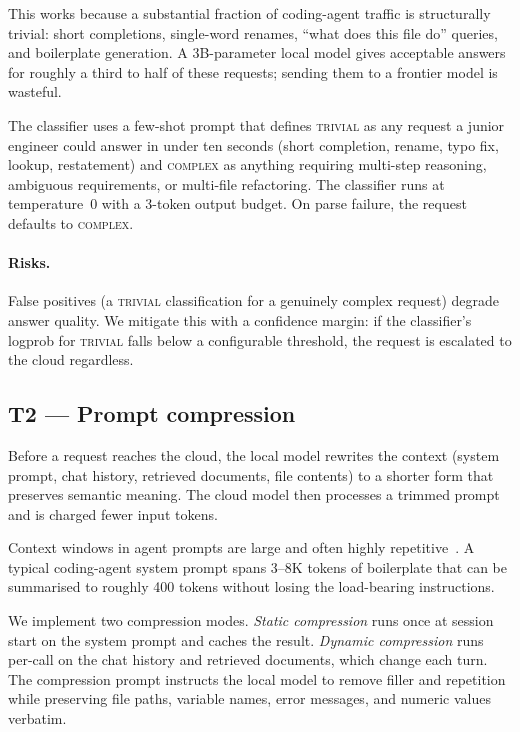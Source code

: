 \documentclass[11pt,a4paper]{article}
\begin{document}
This works because a substantial fraction of coding-agent traffic is
structurally trivial: short completions, single-word renames, ``what
does this file do'' queries, and boilerplate generation. A 3B-parameter
local model gives acceptable answers for roughly a third to half of
these requests; sending them to a frontier model is wasteful.

The classifier uses a few-shot prompt that defines \textsc{trivial} as
any request a junior engineer could answer in under ten seconds (short
completion, rename, typo fix, lookup, restatement) and \textsc{complex}
as anything requiring multi-step reasoning, ambiguous requirements, or
multi-file refactoring. The classifier runs at temperature~0 with a
3-token output budget. On parse failure, the request defaults to
\textsc{complex}.

\paragraph{Risks.}
False positives (a \textsc{trivial} classification for a genuinely
complex request) degrade answer quality. We mitigate this with a
confidence margin: if the classifier's logprob for \textsc{trivial}
falls below a configurable threshold, the request is escalated to the
cloud regardless.

\subsection{T2 --- Prompt compression}
\label{sec:t2}

Before a request reaches the cloud, the local model rewrites the
context (system prompt, chat history, retrieved documents, file
contents) to a shorter form that preserves semantic meaning. The cloud
model then processes a trimmed prompt and is charged fewer input tokens.

Context windows in agent prompts are large and often highly
repetitive~\cite{longbench}. A typical coding-agent system prompt spans
3--8K tokens of boilerplate that can be summarised to roughly 400 tokens
without losing the load-bearing instructions.

We implement two compression modes. \emph{Static compression} runs once
at session start on the system prompt and caches the result.
\emph{Dynamic compression} runs per-call on the chat history and
retrieved documents, which change each turn. The compression prompt
instructs the local model to remove filler and repetition while
preserving file paths, variable names, error messages, and numeric
values verbatim.
\end{document}
